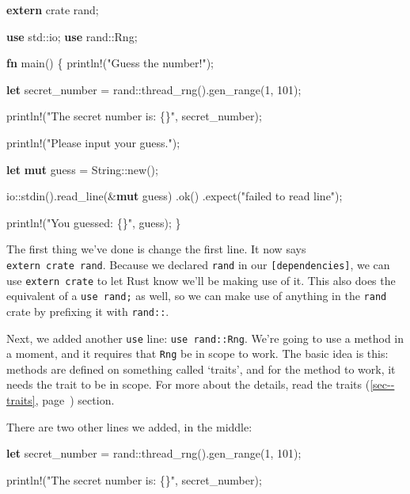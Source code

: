 \documentclass[a4paper,]{book}
\renewcommand*{\hyperref}[2][\ar]{%
  \def\ar{#2}%
  #2 (\autoref{#1}, page~\pageref{#1})}
\newenvironment{Shaded}{\begin{snugshade}}{\end{snugshade}}
\newcommand{\KeywordTok}[1]{\textcolor[rgb]{0.13,0.29,0.53}{\textbf{{#1}}}}
\newcommand{\DecValTok}[1]{\textcolor[rgb]{0.00,0.00,0.81}{{#1}}}
\newcommand{\StringTok}[1]{\textcolor[rgb]{0.31,0.60,0.02}{{#1}}}
\newcommand{\OtherTok}[1]{\textcolor[rgb]{0.56,0.35,0.01}{{#1}}}
\newcommand{\NormalTok}[1]{{#1}}
\begin{document}
\begin{Shaded}
\begin{Highlighting}[]
\KeywordTok{extern} \NormalTok{crate rand;}

\KeywordTok{use} \NormalTok{std::io;}
\KeywordTok{use} \NormalTok{rand::Rng;}

\KeywordTok{fn} \NormalTok{main() \{}
    \OtherTok{println!}\NormalTok{(}\StringTok{"Guess the number!"}\NormalTok{);}

    \KeywordTok{let} \NormalTok{secret_number = rand::thread_rng().gen_range(}\DecValTok{1}\NormalTok{, }\DecValTok{101}\NormalTok{);}

    \OtherTok{println!}\NormalTok{(}\StringTok{"The secret number is: \{\}"}\NormalTok{, secret_number);}

    \OtherTok{println!}\NormalTok{(}\StringTok{"Please input your guess."}\NormalTok{);}

    \KeywordTok{let} \KeywordTok{mut} \NormalTok{guess = String::new();}

    \NormalTok{io::stdin().read_line(&}\KeywordTok{mut} \NormalTok{guess)}
        \NormalTok{.ok()}
        \NormalTok{.expect(}\StringTok{"failed to read line"}\NormalTok{);}

    \OtherTok{println!}\NormalTok{(}\StringTok{"You guessed: \{\}"}\NormalTok{, guess);}
\NormalTok{\}}
\end{Highlighting}
\end{Shaded}

The first thing we've done is change the first line. It now says
\texttt{extern\ crate\ rand}. Because we declared \texttt{rand} in our
\texttt{{[}dependencies{]}}, we can use \texttt{extern\ crate} to let
Rust know we'll be making use of it. This also does the equivalent of a
\texttt{use\ rand;} as well, so we can make use of anything in the
\texttt{rand} crate by prefixing it with \texttt{rand::}.

Next, we added another \texttt{use} line: \texttt{use\ rand::Rng}. We're
going to use a method in a moment, and it requires that \texttt{Rng} be
in scope to work. The basic idea is this: methods are defined on
something called `traits', and for the method to work, it needs the
trait to be in scope. For more about the details, read the
\hyperref[sec--traits]{traits} section.

There are two other lines we added, in the middle:

\begin{Shaded}
\begin{Highlighting}[]
    \KeywordTok{let} \NormalTok{secret_number = rand::thread_rng().gen_range(}\DecValTok{1}\NormalTok{, }\DecValTok{101}\NormalTok{);}

    \OtherTok{println!}\NormalTok{(}\StringTok{"The secret number is: \{\}"}\NormalTok{, secret_number);}
\end{Highlighting}
\end{Shaded}
\end{document}
